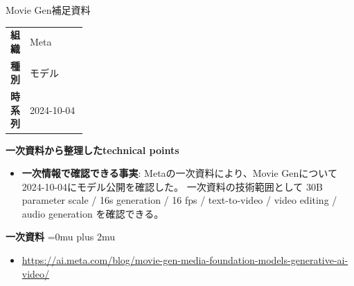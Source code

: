 \begin{technicalnote}{Movie Gen}{補足資料}
\begingroup
\begin{tabularx}{\linewidth}{@{}>{\bfseries}p{0.22\linewidth}X@{}}
組織 & Meta \\
種別 & モデル \\
時系列 & 2024-10-04 \\
\end{tabularx}
\smallskip
{\bfseries 一次資料から整理したtechnical points}
\begin{itemize}[leftmargin=1.5em,itemsep=0.35em]
\item \textbf{一次情報で確認できる事実}: Metaの一次資料により、Movie Genについて2024-10-04にモデル公開を確認した。 一次資料の技術範囲として 30B parameter scale / 16s generation / 16 fps / text-to-video / video editing / audio generation を確認できる。
\end{itemize}
\begin{minipage}{\linewidth}
\begin{samepage}
{\bfseries 一次資料}
\begingroup\sloppy
\Urlmuskip=0mu plus 2mu\relax
\begin{itemize}[leftmargin=1.5em,itemsep=0.25em]
\item {\scriptsize\url{https://ai.meta.com/blog/movie-gen-media-foundation-models-generative-ai-video/}}
\end{itemize}
\endgroup
\end{samepage}
\end{minipage}
\endgroup
\end{technicalnote}
\medskip

